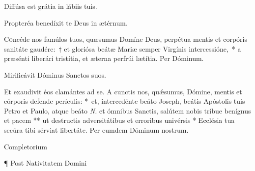 \documentclass[vesperale_romanum.tex]{subfiles}
\begin{document}
\vv Diffúsa est grátia in lábiis tuis.

\rr Propteréa benedíxit te Deus in ætérnum.

\admagnificat

\label{an_beata_mater_in_sabbato_solesmes_1961}


\oratio \label{oratio_bmv}

\lettrine{C}{o}ncéde nos famúlos tuos, quæsumus Domíne Deus, perpétua mentis et corpóris sanitáte gaudére:~† et gloriósa beátæ Mariæ semper Virgínis intercessióne,~* a præsénti liberári tristítia, et æterna perfrúi lætítia. Per Dóminum.





\vv Mirificávit Dóminus Sanctos suos.

\rr Et exaudivit éos clamántes ad se.
%
\oratio
%
\lettrine{A}{} cunctis nos, quǽsumus, Dómine, mentis et córporis defende perículis: \nolinebreak[4]*~et, intercedénte beáto Joseph, beátis Apóstolis tuis Petro et Paulo, atque beáto \textit{N.} et ómnibus Sanctis, salútem nobis tríbue benígnus et pacem ** ut destructis adversitátibus et erroribus univérsis * Ecclésia tua secúra tibi sérviat libertáte. Per eumdem Dóminum nostrum.



Completorium  %


¶ Post Nativitatem Domini 
\end{document}
